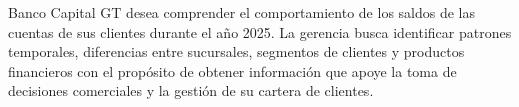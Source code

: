 Banco Capital GT desea comprender el comportamiento de los saldos de las cuentas de sus clientes durante el año 2025. La gerencia busca identificar patrones temporales, diferencias entre sucursales, segmentos de clientes y productos financieros con el propósito de obtener información que apoye la toma de decisiones comerciales y la gestión de su cartera de clientes.